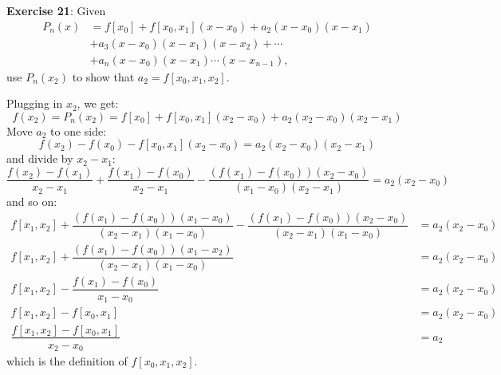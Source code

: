\documentclass{article}
\begin{document}
\textbf{Exercise 21}: Given 
    \begin{align*}
        P_{n}(x) &= f[x_{0}] + f[x_{0}, x_{1}](x - x_{0}) + a_{2}(x - x_{0})(x - x_{1}) \\
                 &+ a_{3}(x - x_{0})(x - x_{1})(x - x_{2}) + \cdots                     \\
                 &+ a_{n}(x - x_{0})(x - x_{1}) \cdots (x - x_{n - 1}),                   
    \end{align*}
use $P_{n}(x_{2})$ to show that $a_{2} = f[x_{0}, x_{1}, x_{2}]$.
    \begin{answer}
        Plugging in $x_{2}$, we get:
            \begin{equation*}
                f(x_{2}) = P_{n}(x_{2}) = f[x_{0}] + f[x_{0}, x_{1}](x_{2} - x_{0}) + a_{2}(x_{2} - x_{0})(x_{2} - x_{1})
            \end{equation*}
        Move $a_{2}$ to one side:
            \begin{equation*}
                f(x_{2}) - f(x_{0}) - f[x_{0}, x_{1}](x_{2} - x_{0}) = a_{2}(x_{2} - x_{0})(x_{2} - x_{1})
            \end{equation*}
        and divide by $x_{2} - x_{1}$:
            \begin{equation*}
                \dfrac{f(x_{2}) - f(x_{1})}{x_{2} - x_{1}} + \dfrac{f(x_{1}) - f(x_{0})}{x_{2} - x_{1}} - \dfrac{(f(x_{1}) - f(x_{0}))(x_{2} - x_{0})}{(x_{1} - x_{0})(x_{2} - x_{1})} = a_{2}(x_{2} - x_{0})
            \end{equation*}
        and so on:
            \begin{align*}
                f[x_{1}, x_{2}] + \dfrac{(f(x_{1}) - f(x_{0}))(x_{1} - x_{0})}{(x_{2} - x_{1})(x_{1} - x_{0})} - \dfrac{(f(x_{1}) - f(x_{0}))(x_{2} - x_{0})}{(x_{2} - x_{1})(x_{1} - x_{0})} &= a_{2}(x_{2} - x_{0}) \\
                f[x_{1}, x_{2}] + \dfrac{(f(x_{1}) - f(x_{0}))(x_{1} - x_{2})}{(x_{2} - x_{1})(x_{1} - x_{0})}                                                                                &= a_{2}(x_{2} - x_{0}) \\
                f[x_{1}, x_{2}] - \dfrac{f(x_{1}) - f(x_{0})}{x_{1} - x_{0}}                                                                                                                  &= a_{2}(x_{2} - x_{0}) \\
                f[x_{1}, x_{2}] - f[x_{0}, x_{1}]                                                                                                                                             &= a_{2}(x_{2} - x_{0}) \\
                \dfrac{f[x_{1}, x_{2}] - f[x_{0}, x_{1}]}{x_{2} - x_{0}}                                                                                                                      &= a_{2}                  
            \end{align*}
        which is the definition of $f[x_{0}, x_{1}, x_{2}]$.
    \end{answer}
\end{document}
